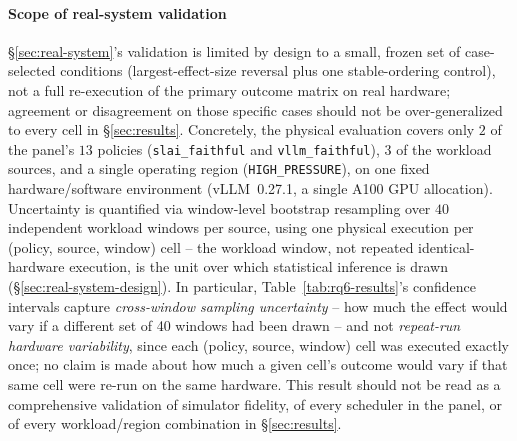 \paragraph{Scope of real-system validation} \S\ref{sec:real-system}'s
validation is limited by design to a small, frozen set of case-selected
conditions (largest-effect-size reversal plus one stable-ordering control),
not a full re-execution of the primary outcome matrix on real hardware; agreement
or disagreement on those specific cases should not be over-generalized to
every cell in \S\ref{sec:results}. Concretely, the physical evaluation
covers only $2$ of the panel's $13$ policies (\texttt{slai\_faithful} and
\texttt{vllm\_faithful}), $3$ of the workload sources, and a single
operating region (\texttt{HIGH\_PRESSURE}), on one fixed
hardware/software environment (vLLM~0.27.1, a single A100 GPU
allocation). Uncertainty is quantified via window-level bootstrap
resampling over $40$ independent workload windows per source, using one
physical execution per (policy, source, window) cell -- the workload
window, not repeated identical-hardware execution, is the unit over which
statistical inference is drawn (\S\ref{sec:real-system-design}). In
particular, Table~\ref{tab:rq6-results}'s confidence intervals capture
\emph{cross-window sampling uncertainty} -- how much the effect would vary
if a different set of 40 windows had been drawn -- and not
\emph{repeat-run hardware variability}, since each (policy, source, window)
cell was executed exactly once; no claim is made about how much a given
cell's outcome would vary if that same cell were re-run on the same
hardware. This result should not be read as a comprehensive validation of
simulator fidelity, of every scheduler in the panel, or of every
workload/region combination in \S\ref{sec:results}.
